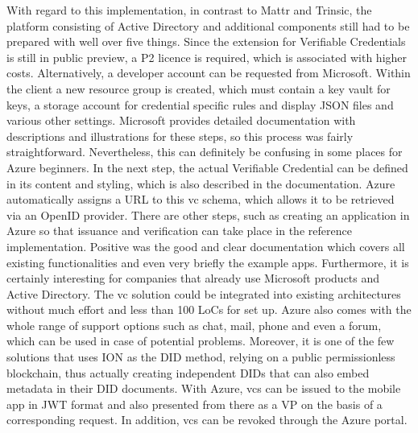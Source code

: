         With regard to this implementation, in contrast to Mattr and Trinsic, the platform consisting of Active Directory and additional components still had to be prepared with well over five things. Since the extension for Verifiable Credentials is still in public preview, a P2 licence is required, which is associated with higher costs. Alternatively, a developer account can be requested from Microsoft. Within the client a new resource group is created, which must contain a key vault for keys, a storage account for credential specific rules and display JSON files and various other settings. Microsoft provides detailed documentation with descriptions and illustrations for these steps, so this process was fairly straightforward. Nevertheless, this can definitely be confusing in some places for Azure beginners. In the next step, the actual Verifiable Credential can be defined in its content and styling, which is also described in the documentation. Azure automatically assigns a URL to this \ac{vc} schema, which allows it to be retrieved via an OpenID provider. There are other steps, such as creating an application in Azure so that issuance and verification can take place in the reference implementation. Positive was the good and clear documentation which covers all existing functionalities and even very briefly the example apps. Furthermore, it is certainly interesting for companies that already use Microsoft products and Active Directory. The \ac{vc} solution could be integrated into existing architectures without much effort and less than 100 LoCs for set up. Azure also comes with the whole range of support options such as chat, mail, phone and even a forum, which can be used in case of potential problems. Moreover, it is one of the few solutions that uses ION as the \ac{DID} method, relying on a public permissionless blockchain, thus actually creating independent \acp{DID} that can also embed metadata in their \ac{DID} documents. With Azure, \acp{vc} can be issued to the mobile app in JWT format and also presented from there as a \ac{VP} on the basis of a corresponding request. In addition, \acp{vc} can be revoked through the Azure portal.  
    
